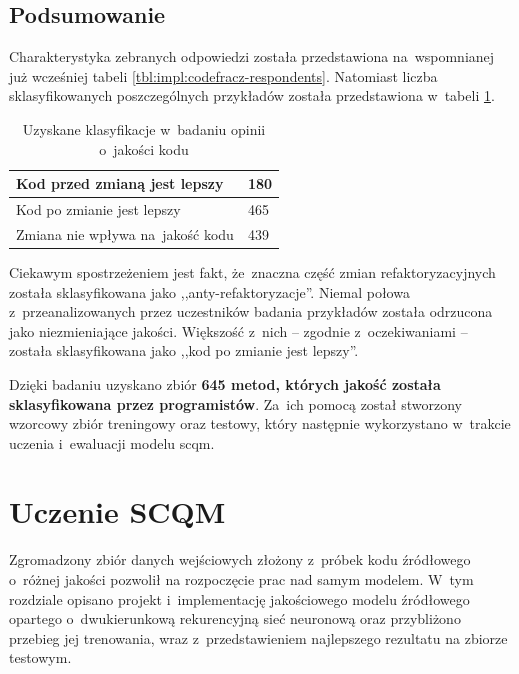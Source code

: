 \documentclass[twoside]{praca}
\begin{document}
\section{Podsumowanie}
\label{sec:impl:codefracz-results}

Charakterystyka zebranych odpowiedzi została przedstawiona na~wspomnianej już wcześniej tabeli \ref{tbl:impl:codefracz-respondents}. Natomiast liczba sklasyfikowanych poszczególnych przykładów została przedstawiona w~tabeli \ref{tbl:impl:codefracz-results}.

\begin{table}[h]
\centering
\caption{Uzyskane klasyfikacje w~badaniu opinii o~jakości kodu}
\label{tbl:impl:codefracz-results}
\begin{tabular}{|l|l|}
  \hline 
  Kod przed zmianą jest lepszy & 180 \\ \hline
  Kod po zmianie jest lepszy & 465 \\ \hline
  Zmiana nie wpływa na~jakość kodu & 439 \\ \hline
\end{tabular} 
\end{table}

Ciekawym spostrzeżeniem jest fakt, że~znaczna część zmian refaktoryzacyjnych została sklasyfikowana jako ,,anty-refaktoryzacje''. Niemal połowa z~przeanalizowanych przez uczestników badania przykładów została odrzucona jako niezmieniające jakości. Większość z~nich -- zgodnie z~oczekiwaniami -- została sklasyfikowana jako ,,kod po zmianie jest lepszy''.

Dzięki badaniu uzyskano zbiór \textbf{645 metod, których jakość została sklasyfikowana przez programistów}. Za~ich pomocą został stworzony wzorcowy zbiór treningowy oraz testowy, który następnie wykorzystano w~trakcie uczenia i~ewaluacji modelu \gls{scqm}.


\cleardoublepage
\chapter{Uczenie SCQM}
\label{ch:learn}

\begin{addmargin}{1cm}
Zgromadzony zbiór danych wejściowych złożony z~próbek kodu źródłowego o~różnej jakości pozwolił na rozpoczęcie prac nad samym modelem. W~tym rozdziale opisano projekt i~implementację jakościowego modelu źródłowego opartego o~dwukierunkową rekurencyjną sieć neuronową oraz przybliżono przebieg jej trenowania, wraz z~przedstawieniem najlepszego rezultatu na zbiorze testowym. 
\end{addmargin}
\end{document}
